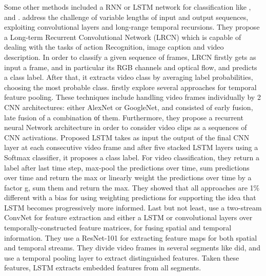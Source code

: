 Some other methods included a RNN or LSTM network for classification like \cite{DBLP:journals/corr/DonahueHGRVSD14}, \cite{DBLP:journals/corr/NgHVVMT15} and \cite{DBLP:journals/corr/MaCKA17}.  \cite{DBLP:journals/corr/DonahueHGRVSD14} address the challenge of variable lengths of
input and output sequences, exploiting convolutional layers and long-range temporal recursions. They propose a Long-term Recurrent
Convolutional Network (LRCN) which is capable of dealing with the tasks of action Recognition, image caption and video description. In order to classify a given sequence of frames, LRCN firstly gets as input a frame, and in particular its RGB channels and optical flow, and predicts a class label. After that, it extracts video class by averaging label probabilities, choosing the most probable class.
\cite{DBLP:journals/corr/NgHVVMT15} firstly explore several approaches for temporal feature pooling. These techniques include handling video
frames individually by 2 CNN architectures: either AlexNet or GoogleNet, and consisted of early fusion, late fusion of a combination οf
them. Furthermore, they propose a recurrent neural Network architecture in order to consider video clips as a sequences of CNN activations.
Proposed LSTM takes as input the output of the final CNN layer at each consecutive video frame and after five stacked LSTM layers using a
Softmax classifier, it proposes a class label. For video classification, they return a label after last time step, max-pool the predictions
over time, sum predictions over time and return the max or linearly weight the predictions over time by a factor g, sum them and return the max.
They showed that all approaches are 1\% different with a bias for using weighting predictions for supporting the idea that LSTM becomes progressively more informed. Last but not least,  \cite{DBLP:journals/corr/MaCKA17} use a two-stream ConvNet for feature extraction and either a LSTM or convolutional layers over temporally-constructed feature matrices, for fusing spatial and temporal information. They use a ResNet-101 for
extracting feature maps for both spatial and temporal streams. They divide video frames in several segments like \cite{DBLP:journals/corr/WangXW0LTG16} did, and use a temporal pooling layer to extract distinguished features. Taken these features, LSTM extracts embedded features from all segments.\par

